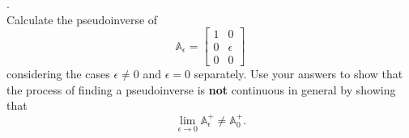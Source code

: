 \documentclass[12 pt]{article}
\begin{document}
. \\
Calculate the pseudoinverse of 
$$\mathbb{A}_{\epsilon} =\begin{bmatrix} 1 & 0 \\ 0 & \epsilon \\ 0 & 0 \end{bmatrix}$$ considering the cases $\epsilon \neq 0$ and $\epsilon = 0$ 
separately. Use your answers to show that the process of finding a pseudoinverse is {\bf not} continuous in general by showing that 
$$
\lim_{\epsilon \to 0} \mathbb{A}_{\epsilon}^+ \neq \mathbb{A}_0^+.
$$
\end{document}

